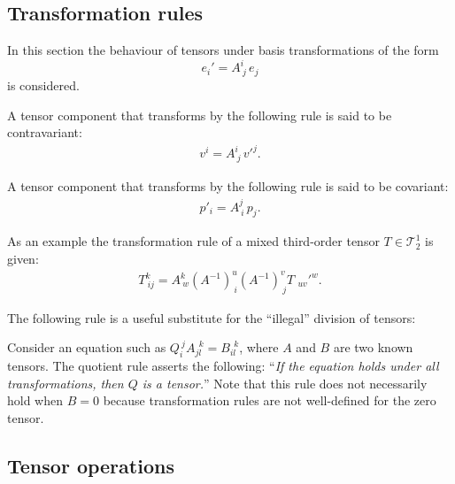 \subsection{Transformation rules}

    In this section the behaviour of tensors under basis transformations of the form \[e_i'=A^i_{\ j}\,e_j\] is considered.

    \begin{definition}[Contravariant]\label{vector:contravariant}
        A tensor component that transforms by the following rule is said to be contravariant:
        \begin{gather}
            v^i = A^i_{\ j}\,v'^j.
        \end{gather}
    \end{definition}
    \begin{definition}[Covariant]\label{vector:covariant}
        A tensor component that transforms by the following rule is said to be covariant:
        \begin{gather}
            p'_i = A^j_{\ i}\,p_j.
        \end{gather}
    \end{definition}
    \begin{example}
        As an example the transformation rule of a mixed third-order tensor $T\in\mathcal{T}^1_2$ is given:
        \begin{gather}
            T_{\ ij}^k = A^k_{\ w}(A^{-1})^u_{\ i}(A^{-1})^v_{\ j}T_{\ \ uv}'^w.
        \end{gather}
    \end{example}

    The following rule is a useful substitute for the ``illegal'' division of tensors:
    \begin{method}
        Consider an equation such as $Q_i^{\ j}A_{jl}^{\ \ k}=B_{il}^{\ \ k}$, where $A$ and $B$ are two known tensors. The quotient rule asserts the following: ``\textit{If the equation holds under all transformations, then $Q$ is a tensor.}'' Note that this rule does not necessarily hold when $B=0$ because transformation rules are not well-defined for the zero tensor.
    \end{method}

\subsection{Tensor operations}

